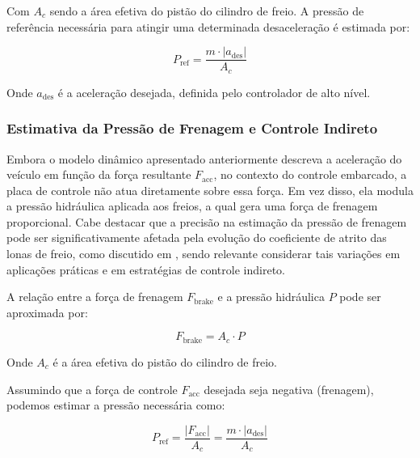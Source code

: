 
Com $A_c$ sendo a área efetiva do pistão do cilindro de freio. A pressão de referência necessária para atingir uma determinada desaceleração é estimada por:

\begin{equation} P_{\text{ref}} = \frac{m \cdot |a_{\text{des}}|}{A_c} \end{equation}

Onde $a_{\text{des}}$ é a aceleração desejada, definida pelo controlador de alto nível.


\subsubsection{Estimativa da Pressão de Frenagem e Controle Indireto}
\label{sec:controle-4-1-3-1}
Embora o modelo dinâmico apresentado anteriormente descreva a aceleração do veículo em função da força resultante $F_{\text{acc}}$, no contexto do controle embarcado, a placa de controle não atua diretamente sobre essa força. Em vez disso, ela modula a pressão hidráulica aplicada aos freios, a qual gera uma força de frenagem proporcional. Cabe destacar que a precisão na estimação da pressão de frenagem pode ser significativamente afetada pela evolução do coeficiente de atrito das lonas de freio, como discutido em , sendo relevante considerar tais variações em aplicações práticas e em estratégias de controle indireto.

A relação entre a força de frenagem $F_{\text{brake}}$ e a pressão hidráulica $P$ pode ser aproximada por:

\begin{equation}
F_{\text{brake}} = A_c \cdot P
\end{equation}

Onde $A_c$ é a área efetiva do pistão do cilindro de freio.

Assumindo que a força de controle $F_{\text{acc}}$ desejada seja negativa (frenagem), podemos estimar a pressão necessária como:

\begin{equation}
P_{\text{ref}} = \frac{|F_{\text{acc}}|}{A_c} = \frac{m \cdot |a_{\text{des}}|}{A_c}
\end{equation}

